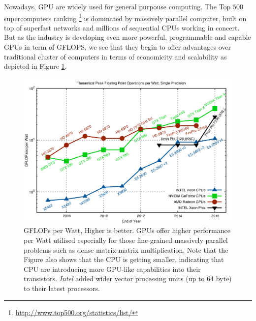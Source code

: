 \begin{description}
\begin{figure}[!htbp]
    \end{figure}
    Nowadays, GPU are widely used for general purpouse computing. The Top $500$ supercomputers  ranking \footnote{\url{http://www.top500.org/statistics/list/}}  \cite{Strohmaier:2006:TS:1188455.1188474} is dominated by massively parallel computer, built on top of superfast networks and millions of sequential CPUs working in concert.
    But as the industry is developing even more powerful, programmable and capable GPUs in term of \si{\giga FLOPS},  we see that they begin to offer advantages over traditional cluster of computers in terms of economicity and scalability as depicted in Figure \ref{gflops-per-watt-sp}.
        \begin{figure}[!htbp]
    	\centering
    	\includegraphics[width=1.0\textwidth]{./images/parallel_programming/gflops-per-watt-sp}
    	\caption{GFLOPs per \si{Watt}, Higher is better. GPUs offer higher performance per Watt utilised especially for those fine-grained massively parallel problems such as dense matrix-matrix multiplication. Note that the Figure also shows that the CPU is getting smaller, indicating that CPU are introducing more GPU-like capabilities into their transistors. \textit{Intel} added wider vector processing units (up to 64 byte) to their latest processors. }
    	\label{gflops-per-watt-sp}
    \end{figure}
  

\end{description}
